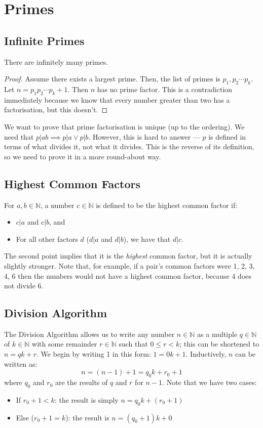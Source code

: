 \documentclass{article}
\begin{document}
	\section{Primes}
	\subsection{Infinite Primes}
	\begin{proposition}
		There are infinitely many primes.
	\end{proposition}
	\begin{proof}
		Assume there exists a largest prime. Then, the list of primes is $p_1, p_2 \cdots p_k$. Let $n=p_1 p_2 \cdots p_k + 1$. Then $n$ has no prime factor. This is a contradiction immediately because we know that every number greater than two has a factorisation, but this doesn't.
	\end{proof}

	We want to prove that prime factorisation is unique (up to the ordering). We need that $p | ab \implies p | a \vee p | b$. However, this is hard to answer --- $p$ is defined in terms of what divides it, not what it divides. This is the reverse of its definition, so we need to prove it in a more round-about way.

	\subsection{Highest Common Factors}
	For $a, b \in \mathbb N$, a number $c \in \mathbb N$ is defined to be the highest common factor if:
	\begin{itemize}
		\item $c | a$ and $c | b$, and
		\item For all other factors $d$ ($d | a$ and $d | b$), we have that $d | c$.
	\end{itemize}
	The second point implies that it is the \textit{highest} common factor, but it is actually slightly stronger. Note that, for example, if a pair's common factors were 1, 2, 3, 4, 6 then the numbers would not have a highest common factor, because 4 does not divide 6.
	
	\subsection{Division Algorithm}
	The Division Algorithm allows us to write any number $n \in \mathbb N$ as a multiple $q\in\mathbb N$ of $k\in \mathbb N$ with some remainder $r\in\mathbb N$ such that $0 \leq r < k$; this can be shortened to $n = qk + r$. We begin by writing 1 in this form: $1 = 0k + 1$. Inductively, $n$ can be written as:
	\[ n = (n-1) + 1 = q_0 k + r_0 + 1 \]
	where $q_0$ and $r_0$ are the results of $q$ and $r$ for $n-1$. Note that we have two cases:
	\begin{itemize}
		\item If $r_0 + 1 < k$: the result is simply $n = q_0k + (r_0+1)$
		\item Else ($r_0 + 1 = k$): the result is $n = (q_0 + 1)k + 0$
	\end{itemize}
\end{document}
